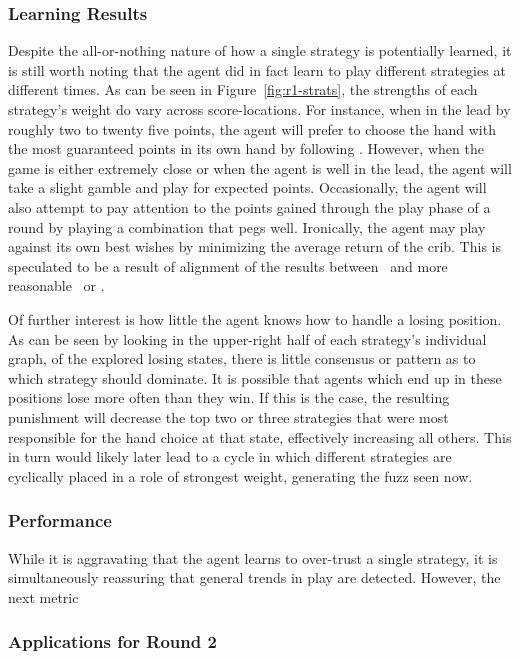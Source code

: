 


\subsubsection{Learning Results}


Despite the all-or-nothing nature of how a single strategy is potentially
learned,
it is still worth noting that the agent did in fact learn to play different
strategies at different times.
%
As can be seen in Figure~\ref{fig:r1-strats},
the strengths of each strategy's weight do vary across score-locations.
%
For instance, when in the lead by
roughly two to twenty five points,
the agent will prefer to choose the hand with the most guaranteed
points in its own hand
by following \handmaxmin.
%
However, when the game is either extremely close
or when the agent is well in the lead,
the agent will take a slight gamble and play for expected points.
%
Occasionally, the agent will also attempt to pay attention to the points
gained through the play phase of a round by playing a combination that pegs
well.
%
Ironically,
the agent may play against its own best wishes by minimizing the average return
of the crib.
%
This is speculated to be a result of alignment of the results between
\cribminavg\ and more reasonable \handmaxmin\
or \handmaxavg.

Of further interest is how little the agent knows how to handle a losing
position.
%
As can be seen by looking in the upper-right half of each strategy's
individual graph,
of the explored losing states,
there is little consensus or pattern as to which strategy should dominate.
%
It is possible that agents which end up in these positions lose more often than
they win.
%
If this is the case,
the resulting punishment will decrease the top two or three strategies that were
most responsible for the hand choice at that state,
effectively increasing all others.
%
This in turn would likely later lead to a cycle in which different strategies
are cyclically placed in a role of strongest weight,
generating the fuzz seen now.


\subsubsection{Performance}

While it is
aggravating that the agent learns to over-trust a single strategy,
it is simultaneously reassuring that general trends in play are detected.
%
However, the next metric


\subsubsection{Applications for Round 2}




